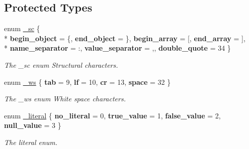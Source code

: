 \subsection*{Protected Types}
\begin{DoxyCompactItemize}
\item 
enum \hyperlink{classformat_1_1value_a048b1ae29385f7eb708899eebddd1e59}{\+\_\+sc} \{ \\*
{\bfseries begin\+\_\+object} = \textquotesingle{}\{\textquotesingle{}, 
{\bfseries end\+\_\+object} = \textquotesingle{}\}\textquotesingle{}, 
{\bfseries begin\+\_\+array} = \textquotesingle{}\mbox{[}\textquotesingle{}, 
{\bfseries end\+\_\+array} = \textquotesingle{}\mbox{]}\textquotesingle{}, 
\\*
{\bfseries name\+\_\+separator} = \textquotesingle{}\+:\textquotesingle{}, 
{\bfseries value\+\_\+separator} = \textquotesingle{},\textquotesingle{}, 
{\bfseries double\+\_\+quote} = 34
 \}\hypertarget{classformat_1_1value_a048b1ae29385f7eb708899eebddd1e59}{}\label{classformat_1_1value_a048b1ae29385f7eb708899eebddd1e59}
\begin{DoxyCompactList}\small\item\em The \+\_\+sc enum Structural characters. \end{DoxyCompactList}
\item 
enum \hyperlink{classformat_1_1value_a6720d6d39ff203499cfd97747487320b}{\+\_\+ws} \{ {\bfseries tab} = 9, 
{\bfseries lf} = 10, 
{\bfseries cr} = 13, 
{\bfseries space} = 32
 \}\hypertarget{classformat_1_1value_a6720d6d39ff203499cfd97747487320b}{}\label{classformat_1_1value_a6720d6d39ff203499cfd97747487320b}
\begin{DoxyCompactList}\small\item\em The \+\_\+ws enum White space characters. \end{DoxyCompactList}
\item 
enum \hyperlink{classformat_1_1value_a953390030c22a816b7c9b2b54d4992a8}{\+\_\+literal} \{ {\bfseries no\+\_\+literal} = 0, 
{\bfseries true\+\_\+value} = 1, 
{\bfseries false\+\_\+value} = 2, 
{\bfseries null\+\_\+value} = 3
 \}\hypertarget{classformat_1_1value_a953390030c22a816b7c9b2b54d4992a8}{}\label{classformat_1_1value_a953390030c22a816b7c9b2b54d4992a8}
\begin{DoxyCompactList}\small\item\em The literal enum. \end{DoxyCompactList}
\end{DoxyCompactItemize}
